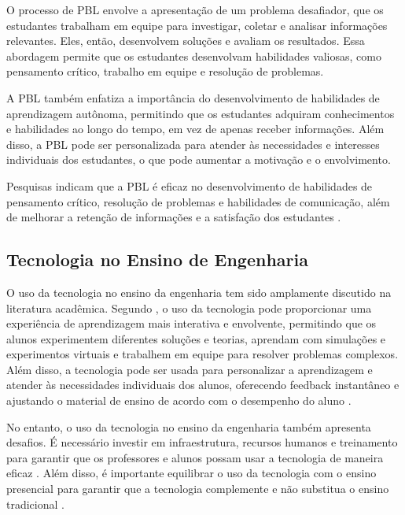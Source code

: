 \documentclass{article}
\begin{document}
O processo de PBL envolve a apresentação de um problema desafiador, que os estudantes trabalham em equipe para investigar, coletar e analisar informações relevantes. Eles, então, desenvolvem soluções e avaliam os resultados. Essa abordagem permite que os estudantes desenvolvam habilidades valiosas, como pensamento crítico, trabalho em equipe e resolução de problemas.

A PBL também enfatiza a importância do desenvolvimento de habilidades de aprendizagem autônoma, permitindo que os estudantes adquiram conhecimentos e habilidades ao longo do tempo, em vez de apenas receber informações. Além disso, a PBL pode ser personalizada para atender às necessidades e interesses individuais dos estudantes, o que pode aumentar a motivação e o envolvimento.

Pesquisas indicam que a PBL é eficaz no desenvolvimento de habilidades de pensamento crítico, resolução de problemas e habilidades de comunicação, além de melhorar a retenção de informações e a satisfação dos estudantes \cite{hmelo2007}.


\subsection{Tecnologia no Ensino de Engenharia}
O uso da tecnologia no ensino da engenharia tem sido amplamente discutido na literatura acadêmica. Segundo , o uso da tecnologia pode proporcionar uma experiência de aprendizagem mais interativa e envolvente, permitindo que os alunos experimentem diferentes soluções e teorias, aprendam com simulações e experimentos virtuais e trabalhem em equipe para resolver problemas complexos. Além disso, a tecnologia pode ser usada para personalizar a aprendizagem e atender às necessidades individuais dos alunos, oferecendo feedback instantâneo e ajustando o material de ensino de acordo com o desempenho do aluno \cite{kay2009}.

No entanto, o uso da tecnologia no ensino da engenharia também apresenta desafios. É necessário investir em infraestrutura, recursos humanos e treinamento para garantir que os professores e alunos possam usar a tecnologia de maneira eficaz \cite{lazaroiu2015}. Além disso, é importante equilibrar o uso da tecnologia com o ensino presencial para garantir que a tecnologia complemente e não substitua o ensino tradicional \cite{reinholz2018}.
\end{document}
